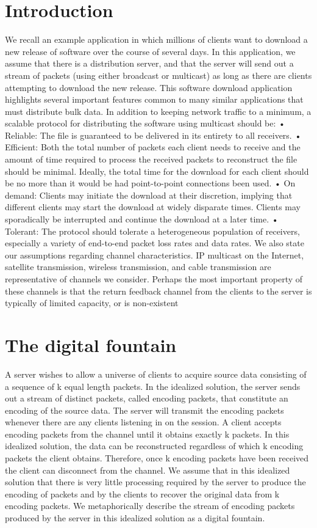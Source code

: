 \documentclass[12pt,a4paper,titlepage,twocolumn]{article}
\begin{document}
\section{Introduction}
We recall an example application in which millions of
clients want to download a new release of software over
the course of several days. In this application, we assume
that there is a distribution server, and that the
server will send out a stream of packets (using either
broadcast or multicast) as long as there are clients attempting
to download the new release. This software
download application highlights several important features
common to many similar applications that must
distribute bulk data. In addition to keeping network
traffic to a minimum, a scalable protocol for distributing
the software using multicast should be:
• Reliable: The file is guaranteed to be delivered
in its entirety to all receivers.
• Efficient: Both the total number of packets each
client needs to receive and the amount of time required
to process the received packets to reconstruct
the file should be minimal. Ideally, the total
time for the download for each client should
be no more than it would be had point-to-point
connections been used.
• On demand: Clients may initiate the download
at their discretion, implying that different clients
may start the download at widely disparate times.
Clients may sporadically be interrupted and continue
the download at a later time.
• Tolerant: The protocol should tolerate a heterogeneous
population of receivers, especially a variety
of end-to-end packet loss rates and data rates.
We also state our assumptions regarding channel
characteristics. IP multicast on the Internet, satellite
transmission, wireless transmission, and cable transmission
are representative of channels we consider. Perhaps
the most important property of these channels is
that the return feedback channel from the clients to the
server is typically of limited capacity, or is non-existent
\section{The digital fountain}
A server wishes to allow a universe of clients to acquire
source data consisting of a sequence of k equal
length packets. In the idealized solution, the server
sends out a stream of distinct packets, called encoding
packets, that constitute an encoding of the source data.
The server will transmit the encoding packets whenever
there are any clients listening in on the session. A client
accepts encoding packets from the channel until it obtains
exactly k packets. In this idealized solution, the
data can be reconstructed regardless of which k encoding
packets the client obtains. Therefore, once k encoding
packets have been received the client can disconnect
from the channel. We assume that in this idealized solution
that there is very little processing required by
the server to produce the encoding of packets and by
the clients to recover the original data from k encoding
packets.
We metaphorically describe the stream of encoding
packets produced by the server in this idealized solution
as a digital fountain.
\end{document}
